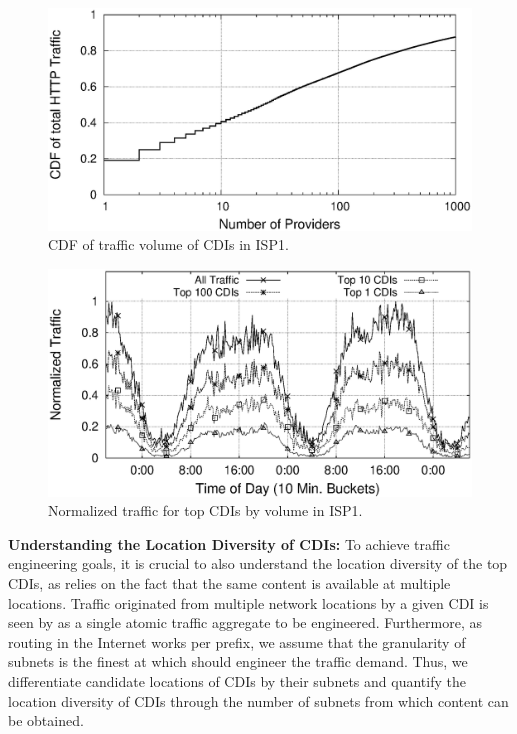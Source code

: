 \begin{figure}[tbp]
\center\includegraphics[width=1\linewidth]{figures/providersVsVolume.eps}
\caption{CDF of traffic volume of CDIs in ISP1.}
\label{fig:CDF-Traffic-CPs}
\vspace{-1.5em}
\end{figure}


\begin{figure}[tbp]
\center\includegraphics[width=1\linewidth]{figures/Volume_timeseries.eps}
\caption{Normalized traffic for top CDIs by volume in ISP1.}
\label{fig:CPs-Total-Traffic}
\vspace{-1.5em}
\end{figure}



\noindent\textbf{Understanding the Location Diversity of CDIs:}\label{sec:Traffic-by-Content-Provider}
To achieve traffic engineering goals, it is crucial to also understand the
location diversity of the top CDIs, as \cate relies on the fact that the same
content is available at multiple locations.  Traffic originated from multiple
network locations by a given CDI is seen by \cate as a single atomic traffic
aggregate to be engineered. Furthermore, as routing in the Internet works per
prefix, we assume that the granularity of subnets is the finest at which \cate
should engineer the traffic demand. Thus, we differentiate candidate locations
of CDIs by their subnets and quantify the location diversity of CDIs through the
number of subnets from which content can be obtained.

